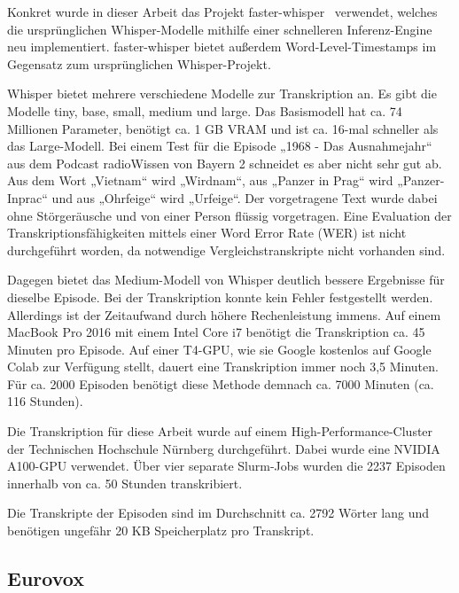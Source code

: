 Konkret wurde in dieser Arbeit das Projekt faster-whisper~\cite{2024c} verwendet, welches die ursprünglichen Whisper-Modelle mithilfe einer schnelleren Inferenz-Engine neu implementiert.
faster-whisper bietet außerdem Word-Level-Timestamps im Gegensatz zum ursprünglichen Whisper-Projekt.

Whisper bietet mehrere verschiedene Modelle zur Transkription an.
Es gibt die Modelle tiny, base, small, medium und large.
Das Basismodell hat ca. 74 Millionen Parameter, benötigt ca. 1 GB VRAM und ist ca. 16-mal schneller als das Large-Modell.
Bei einem Test für die Episode „1968 - Das Ausnahmejahr“~\cite{zotero-543} aus dem Podcast radioWissen von Bayern 2 schneidet es aber nicht sehr gut ab.
Aus dem Wort „Vietnam“ wird „Wirdnam“, aus „Panzer in Prag“ wird „Panzer-Inprac“ und aus „Ohrfeige“ wird „Urfeige“.
Der vorgetragene Text wurde dabei ohne Störgeräusche und von einer Person flüssig vorgetragen.
Eine Evaluation der Transkriptionsfähigkeiten mittels einer Word Error Rate (WER) ist nicht durchgeführt worden, da notwendige Vergleichstranskripte nicht vorhanden sind.

Dagegen bietet das Medium-Modell von Whisper deutlich bessere Ergebnisse für dieselbe Episode.
Bei der Transkription konnte kein Fehler festgestellt werden.
Allerdings ist der Zeitaufwand durch höhere Rechenleistung immens.
Auf einem MacBook Pro 2016 mit einem Intel Core i7 benötigt die Transkription ca. 45 Minuten pro Episode.
Auf einer T4-GPU, wie sie Google kostenlos auf Google Colab zur Verfügung stellt, dauert eine Transkription immer noch 3,5 Minuten.
Für ca. 2000 Episoden benötigt diese Methode demnach ca. 7000 Minuten (ca. 116 Stunden).

Die Transkription für diese Arbeit wurde auf einem High-Performance-Cluster der Technischen Hochschule Nürnberg durchgeführt.
Dabei wurde eine NVIDIA A100-GPU verwendet.
Über vier separate Slurm-Jobs wurden die 2237 Episoden innerhalb von ca. 50 Stunden transkribiert.

Die Transkripte der Episoden sind im Durchschnitt ca. 2792 Wörter lang und benötigen ungefähr 20 KB Speicherplatz pro Transkript.



\subsection{Eurovox}

